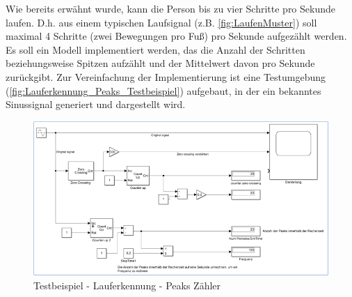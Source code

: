 Wie bereits erwähnt wurde, kann die Person bis zu vier Schritte pro Sekunde laufen. D.h. aus einem typischen Laufsignal (z.B. \autoref{fig:LaufenMuster}) soll maximal 4 Schritte (zwei Bewegungen pro Fuß) pro Sekunde aufgezählt werden.
Es soll ein Modell implementiert werden, das die Anzahl der Schritten beziehungsweise Spitzen aufzählt und der Mittelwert davon pro Sekunde zurückgibt. Zur Vereinfachung der Implementierung ist eine Testumgebung (\autoref{fig:Lauferkennung_Peaks_Testbeispiel}) aufgebaut, in der ein bekanntes Sinussignal generiert und dargestellt wird.
\begin{figure}[H]
	\centering
	\includegraphics[width=\linewidth]{Bilder/Lauferkennung_Peaks_Testbeispiel.png}
	\caption{Testbeispiel - Lauferkennung - Peaks Zähler}
	\label{fig:Lauferkennung_Peaks_Testbeispiel}
\end{figure}

